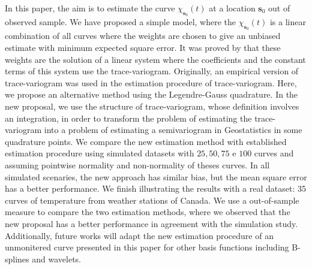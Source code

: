 \documentclass[12pt]{interact}
\theoremstyle{plain}%
\theoremstyle{definition}
\theoremstyle{remark}
\begin{document}
In this paper, the aim is to estimate the curve \(\chi_{\bm{s}_0}(t)\) at a location \(\bm{s}_0\) out of observed sample. We have proposed a simple model, where the \(\chi_{\bm{s}_0}(t)\) is a linear combination of all curves where the weights are chosen to give an unbiased estimate with minimum expected square error. It was proved by \citet{giraldo2011ordinary} that these weights are the solution of a linear system where the coefficients and the constant terms of this system use the trace-variogram. Originally, an empirical version of trace-variogram was used in the estimation procedure of trace-variogram. Here, we propose an alternative method using the Legendre-Gauss quadrature. In the new proposal, we use the structure of trace-variogram, whose definition involves an integration, in order to transform the problem of estimating the trace-variogram into a problem of estimating a semivariogram in Geostatistics in some quadrature points. We compare the new estimation method with established estimation procedure using simulated datasets with \(25,50,75\) e \(100\) curves and assuming pointwise normality and non-normality of theses curves. In all simulated scenaries, the new approach has similar bias, but the mean square error has a better performance. We finish illustrating the results with a real dataset: 35 curves of temperature from weather stations of Canada. We use a out-of-sample measure to compare the two estimation methods, where we observed that the new proposal has a better performance in agreement with the simulation study. Additionally, future works will adapt the new estimation procedure of an unmonitered curve presented in this paper for other basis functions including B-splines and wavelets.


\end{document}
